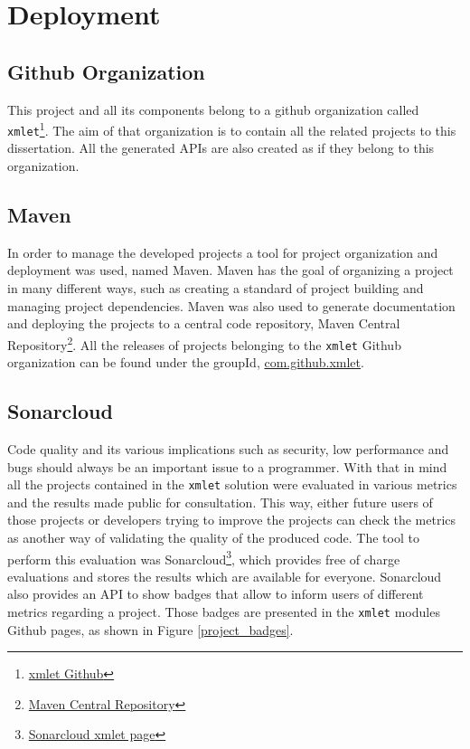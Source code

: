 \chapter{Deployment}
\label{cha:deployment}

\section{Github Organization} %
\label{sec:github}

This project and all its components belong to a github organization called \texttt{xmlet}\footnote{\href{https://github.com/xmlet}{xmlet Github}}. The aim of that organization is to contain all the related projects to this dissertation. All the generated \ac{API}s are also created as if they belong to this organization. 

\section{Maven} %
\label{sec:maven}

In order to manage the developed projects a tool for project organization and deployment was used, named Maven. Maven has the goal of organizing a project in many different ways, such as creating a standard of project building and managing project dependencies. Maven was also used to generate documentation and deploying the projects to a central code repository, Maven Central Repository\footnote{\href{https://search.maven.org/}{Maven Central Repository}}. All the releases of projects belonging to the \texttt{xmlet} Github organization can be found under the groupId, \href{https://search.maven.org/#search%7Cga%7C1%7Ccom.github.xmlet}{com.github.xmlet}. 

\section{Sonarcloud} %
\label{sec:sonarcloud}

Code quality and its various implications such as security, low performance and bugs should always be an important issue to a programmer. With that in mind all the projects contained in the \texttt{xmlet} solution were evaluated in various metrics and the results made public for consultation. This way, either future users of those projects or developers trying to improve the projects can check the metrics as another way of validating the quality of the produced code. The tool to perform this evaluation was Sonarcloud\footnote{\href{https://sonarcloud.io/organizations/xmlet/projects}{Sonarcloud xmlet page}}, which provides free of charge evaluations and stores the results which are available for everyone. Sonarcloud also provides an \ac{API} to show badges that allow to inform users of different metrics regarding a project. Those badges are presented in the \texttt{xmlet} modules Github pages, as shown in Figure \ref{project_badges}.


